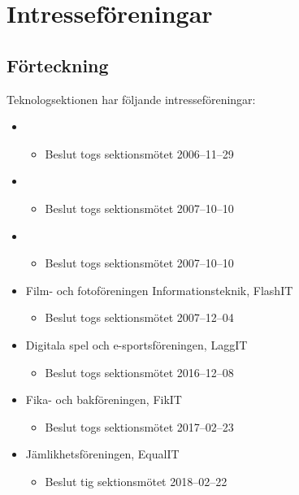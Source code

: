 \section{Intresseföreningar}

\subsection{Förteckning}

Teknologsektionen har följande intresseföreningar:

\begin{itemize}
	\item \EIGHTBITFULL{}
	\begin{itemize}
		\item Beslut togs sektionsmötet 2006--11--29
	\end{itemize}
	\item \DRAWITFULL{}
	\begin{itemize}
		\item Beslut togs sektionsmötet 2007--10--10
	\end{itemize}
	\item \HOOKITFULL{}
	\begin{itemize}
		\item Beslut togs sektionsmötet 2007--10--10
	\end{itemize}
	\item Film- och fotoföreningen Informationsteknik, FlashIT
	\begin{itemize}
		\item Beslut togs sektionsmötet 2007--12--04
	\end{itemize}
	\item Digitala spel och e-sportsföreningen, LaggIT
	\begin{itemize}
		\item Beslut togs sektionsmötet 2016--12--08
	\end{itemize}
        \item Fika- och bakföreningen, FikIT
        \begin{itemize}
                \item Beslut togs sektionsmötet 2017--02--23
        \end{itemize}
	\item  Jämlikhetsföreningen, EqualIT
	\begin{itemize}
		\item  Beslut tig sektionsmötet 2018--02--22
	\end{itemize}
\end{itemize}